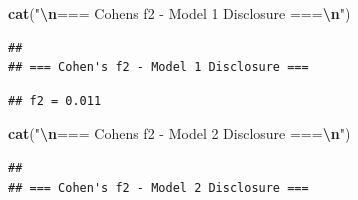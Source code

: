 \documentclass[
]{article}
\newenvironment{Shaded}{\begin{snugshade}}{\end{snugshade}}
\newcommand{\DecValTok}[1]{\textcolor[rgb]{0.00,0.00,0.81}{#1}}
\newcommand{\FunctionTok}[1]{\textcolor[rgb]{0.13,0.29,0.53}{\textbf{#1}}}
\newcommand{\NormalTok}[1]{#1}
\newcommand{\SpecialCharTok}[1]{\textcolor[rgb]{0.81,0.36,0.00}{\textbf{#1}}}
\newcommand{\StringTok}[1]{\textcolor[rgb]{0.31,0.60,0.02}{#1}}
\begin{document}
\begin{Shaded}
\begin{Highlighting}[]
\FunctionTok{cat}\NormalTok{(}\StringTok{"}\SpecialCharTok{\textbackslash{}n}\StringTok{=== Cohen\textquotesingle{}s f2 {-} Model 1 Disclosure ===}\SpecialCharTok{\textbackslash{}n}\StringTok{"}\NormalTok{)}
\end{Highlighting}
\end{Shaded}

\begin{verbatim}
## 
## === Cohen's f2 - Model 1 Disclosure ===
\end{verbatim}

\begin{Shaded}
\end{Shaded}

\begin{verbatim}
## f2 = 0.011
\end{verbatim}

\begin{Shaded}
\begin{Highlighting}[]
\FunctionTok{cat}\NormalTok{(}\StringTok{"}\SpecialCharTok{\textbackslash{}n}\StringTok{=== Cohen\textquotesingle{}s f2 {-} Model 2 Disclosure ===}\SpecialCharTok{\textbackslash{}n}\StringTok{"}\NormalTok{)}
\end{Highlighting}
\end{Shaded}

\begin{verbatim}
## 
## === Cohen's f2 - Model 2 Disclosure ===
\end{verbatim}

\begin{Shaded}
\end{Shaded}
\end{document}
